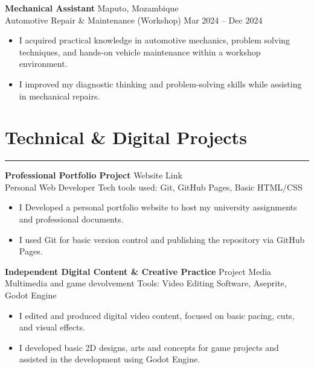 \documentclass[10pt,a4paper]{article}
\begin{document}
\vspace{2mm}

\textbf{Mechanical Assistant} \hfill Maputo, Mozambique \\
Automotive Repair \& Maintenance (Workshop) \hfill Mar 2024 -- Dec 2024 \\
\begin{itemize}
    \item I acquired practical knowledge in automotive mechanics, problem solving techniques, and hands-on vehicle maintenance within a workshop environment.
    \item I improved my diagnostic thinking and problem-solving skills while assisting in mechanical repairs.
\end{itemize}

\vspace{3mm}


\section*{Technical \& Digital Projects}
\hrule \vspace{1mm}
\textbf{Professional Portfolio Project} \hfill Website Link \\
Personal Web Developer   \hfill Tech tools used: Git, GitHub Pages, Basic HTML/CSS \\
\begin{itemize}
    \item  I Developed a personal portfolio website to host my university assignments and professional documents.
    \item I used Git for basic version control and publishing the repository via GitHub Pages.
\end{itemize}

\vspace{2mm}

\textbf{Independent Digital Content \& Creative Practice} \hfill Project Media \\
Multimedia and game devolvement \hfill Tools: Video Editing Software, Aseprite, Godot Engine \\
\begin{itemize}
    \item I edited and produced digital video content, focused on basic pacing, cuts, and visual effects.
    \item I developed basic 2D designs, arts and concepts for game projects and assisted in the development using Godot Engine.
\end{itemize}
\end{document}
